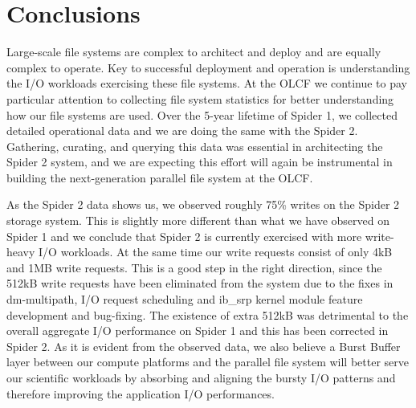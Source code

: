 \section{Conclusions}
\label{sec:conc}

Large-scale file systems are complex to architect and deploy and are equally
complex to operate. Key to successful deployment and operation is understanding
the I/O workloads exercising these file systems. At the OLCF we continue to pay
particular attention to collecting file system statistics for better
understanding how our file systems are used. Over the 5-year lifetime of Spider
1, we collected detailed operational data and we are doing the same with the
Spider 2. Gathering, curating, and querying this data was essential in
architecting the Spider 2 system, and we are expecting this effort will again
be instrumental in building the next-generation parallel file system at the
OLCF.


As the Spider 2 data shows us, we observed roughly 75\% writes on the Spider 2
storage system. This is slightly more different than what we have observed on
Spider 1 and we conclude that Spider 2 is currently exercised with more
write-heavy I/O workloads. At the same time our write requests consist of only
4kB and 1MB write requests. This is a good step in the right direction, since
the 512kB write requests have been eliminated from the system due to the fixes
in dm-multipath, I/O request scheduling and ib\_srp kernel module feature
development and bug-fixing. The existence of extra 512kB was detrimental to the
overall aggregate I/O performance on Spider 1 and this has been corrected in
Spider 2. As it is evident from the observed data, we also believe a Burst
Buffer layer between our compute platforms and the parallel file system will
better serve our scientific workloads by absorbing and aligning the bursty I/O
patterns and therefore improving the application I/O performances. 
